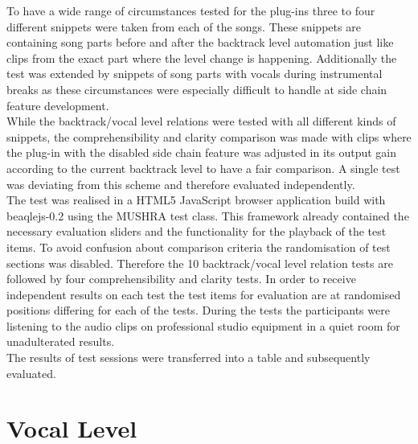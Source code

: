 To have a wide range of circumstances tested for the plug-ins three to four different snippets were taken from each of the songs. These snippets are containing song parts before and after the backtrack level automation just like clips from the exact part where the level change is happening. Additionally the test was extended by snippets of song parts with vocals during instrumental breaks as these circumstances were especially difficult to handle at side chain feature development.\\
While the backtrack/vocal level relations were tested with all different kinds of snippets, the comprehensibility and clarity comparison was made with clips where the plug-in with the disabled side chain feature was adjusted in its output gain according to the current backtrack level to have a fair comparison. A single test was deviating from this scheme and therefore evaluated independently.\\
The test was realised in a HTML5 JavaScript browser application build with beaqlejs-0.2\cite{beaqleJS} using the MUSHRA test class. This framework already contained the necessary evaluation sliders and the functionality for the playback of the test items. To avoid confusion about comparison criteria the randomisation of test sections was disabled. Therefore the 10 backtrack/vocal level relation tests are followed by four comprehensibility and clarity tests. In order to receive independent results on each test the test items for evaluation are at randomised positions differing for each of the tests. During the tests the participants were listening to the audio clips on professional studio equipment in a quiet room for unadulterated results.\\
The results of test sessions were transferred into a table and subsequently evaluated.\\

\section{Vocal Level}

